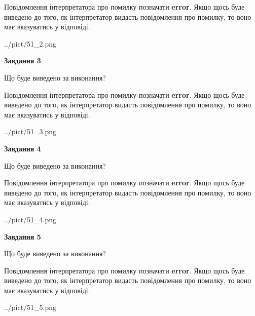 \documentclass[12pt, ukrainian]{article}
\begin{document}
{\begin {large}
Повідомлення інтерпретатора про помилку позначати \textbf{error}.
Якщо щось буде виведено до того, як інтерпретатор видасть повідомлення про помилку, 
то воно має вказуватись у відповіді. \par


\begin{center}
	{../pict/51_2.png}
\end{center}
\newpage

{\begin {center}\textbf{Завдання 3}\end {center}}\par
Що буде виведено за виконання?

Повідомлення інтерпретатора про помилку позначати \textbf{error}.
Якщо щось буде виведено до того, як інтерпретатор видасть повідомлення про помилку, 
то воно має вказуватись у відповіді. \par


\begin{center}
	{../pict/51_3.png}
\end{center}
\newpage

{\begin {center}\textbf{Завдання 4}\end {center}}\par
Що буде виведено за виконання?

Повідомлення інтерпретатора про помилку позначати \textbf{error}.
Якщо щось буде виведено до того, як інтерпретатор видасть повідомлення про помилку, 
то воно має вказуватись у відповіді. \par


\begin{center}
	{../pict/51_4.png}
\end{center}
\newpage

{\begin {center}\textbf{Завдання 5}\end {center}}\par
Що буде виведено за виконання?

Повідомлення інтерпретатора про помилку позначати \textbf{error}.
Якщо щось буде виведено до того, як інтерпретатор видасть повідомлення про помилку, 
то воно має вказуватись у відповіді. \par


\begin{center}
	{../pict/51_5.png}
\end{center}
\newpage


\end{large}}
\end{document}
